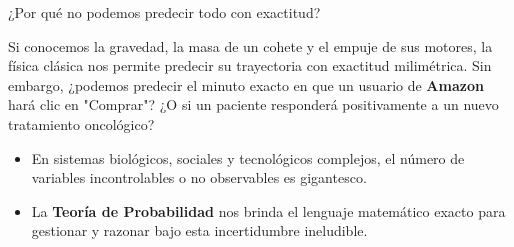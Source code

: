 \begin{frame}{¿Por qué no podemos predecir todo con exactitud?}
  \begin{motivacion}
    Si conocemos la gravedad, la masa de un cohete y el empuje de sus motores, la física clásica nos permite predecir su trayectoria con exactitud milimétrica. Sin embargo, ¿podemos predecir el minuto exacto en que un usuario de \textbf{Amazon} hará clic en "Comprar"? ¿O si un paciente responderá positivamente a un nuevo tratamiento oncológico?
  \end{motivacion}
  
  \vspace{0.6em}
  \pause
  \begin{itemize}
    \item En sistemas biológicos, sociales y tecnológicos complejos, el número de variables incontrolables o no observables es gigantesco. \pause
    \item La \textbf{Teoría de Probabilidad} nos brinda el lenguaje matemático exacto para gestionar y razonar bajo esta incertidumbre ineludible.
  \end{itemize}
\end{frame}

